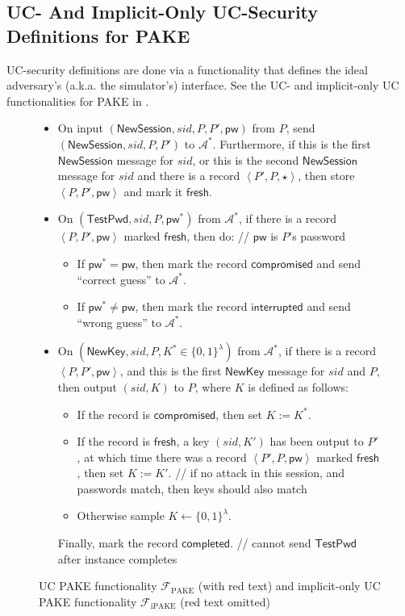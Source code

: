 \documentclass{article}
\newcommand{\adv}{\mathcal{A}}
\newcommand{\func}{\mathcal{F}}
\newcommand{\Fpake}{\func_\mathrm{PAKE}}
\newcommand{\Fipake}{\func_\mathrm{iPAKE}}
\newcommand{\pw}{\mathsf{pw}}
\newcommand{\NewSession}{\mathsf{NewSession}}
\newcommand{\TestPwd}{\mathsf{TestPwd}}
\newcommand{\NewKey}{\mathsf{NewKey}}
\newcommand{\fresh}{\mathsf{fresh}}
\newcommand{\compromised}{\mathsf{compromised}}
\newcommand{\interrupted}{\mathsf{interrupted}}
\newcommand{\completed}{\mathsf{completed}}
\begin{document}
\subsection{UC- And Implicit-Only UC-Security Definitions for PAKE}
\label{sec:UC}
UC-security definitions are done via a functionality that defines the ideal adversary's (a.k.a. the simulator's) interface. See the UC- and implicit-only UC functionalities for PAKE in .
\begin{figure}[H]
\begin{framed}
\begin{small}
\begin{itemize}
  \item On input $(\NewSession, sid, P, P', \pw)$ from $P$, send $(\NewSession, sid, P, P')$ to $\adv^*$. Furthermore, if this is the first $\NewSession$ message for $sid$, or this is the second $\NewSession$ message for $sid$ and there is a record $\left<P',P,\star\right>$, then store $\left<P,P',\pw\right>$ and mark it $\fresh$.
  \item On $(\TestPwd, sid, P, \pw^*)$ from $\adv^*$, if there is a record $\left<P,P',\pw\right>$ marked $\fresh$, then do: \quad \textcolor[gray]{0.5}{// $\pw$ is $P$'s password}
      \begin{itemize}
        \item If $\pw^* = \pw$, then mark the record $\compromised$ {\color{red}and send ``correct guess'' to $\adv^*$}.
        \item If $\pw^* \neq \pw$, then mark the record $\interrupted$ {\color{red}and send ``wrong guess'' to $\adv^*$}.
      \end{itemize}
        \item On $(\NewKey, sid, P, K^* \in \{0,1\}^\lambda)$ from $\adv^*$, if there is a record $\left<P,P',\pw\right>$, and this is the first $\NewKey$ message for $sid$ and $P$, then output $(sid, K)$ to $P$, where $K$ is defined as follows:
            \begin{itemize}
              \item If the record is $\compromised$, then set $K := K^*$.
              \item If the record is $\fresh$, a key $(sid, K')$ has been output to $P'$, at which time there was a record $\left<P',P,\pw\right>$ marked $\fresh$, then set $K := K'$. \quad \textcolor[gray]{0.5}{// if no attack in this session, and passwords match, then keys should also match}
              \item Otherwise sample $K \gets \{0,1\}^\lambda$.
            \end{itemize}
            Finally, mark the record $\completed$. \quad \textcolor[gray]{0.5}{// cannot send $\TestPwd$ after instance completes}
    \end{itemize}
\end{small}
\end{framed}
\caption{UC PAKE functionality $\Fpake$ (with red text) and implicit-only UC PAKE functionality $\Fipake$ (red text omitted)}
\label{fig:pake-func}
\end{figure}
\end{document}
